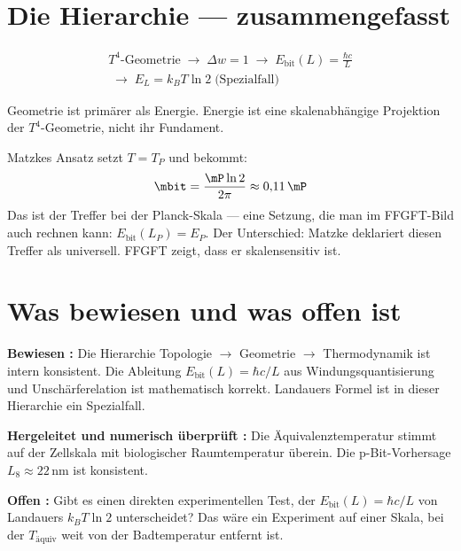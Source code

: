 \section{Die Hierarchie --- zusammengefasst}

\begin{multline*}
  T^4\text{-Geometrie}
  \;\longrightarrow\; \Delta w = 1
  \;\longrightarrow\; E_\text{bit}(L) = \frac{\hbar c}{L} \\
  \;\longrightarrow\; E_L = k_BT\ln 2 \;\text{(Spezialfall)}
\end{multline*}

Geometrie ist primärer als Energie. Energie ist eine skalenabhängige
Projektion der $T^4$-Geometrie, nicht ihr Fundament. 

Matzkes Ansatz setzt $T = T_P$ und bekommt:
\[
  \mbit = \frac{\mP \ln 2}{2\pi} \approx 0{,}11\,\mP
\]
Das ist der Treffer bei der Planck-Skala --- eine Setzung, die man
im FFGFT-Bild auch rechnen kann: $E_\text{bit}(L_P) = E_P$.
Der Unterschied: Matzke deklariert diesen Treffer als universell.
FFGFT zeigt, dass er skalensensitiv ist. 

\section{Was bewiesen und was offen ist}

\textbf{Bewiesen :} Die Hierarchie Topologie $\to$ Geometrie $\to$
Thermodynamik ist intern konsistent. Die Ableitung $E_\text{bit}(L) = \hbar c/L$
aus Windungsquantisierung und Unschärferelation ist mathematisch korrekt.
Landauers Formel ist in dieser Hierarchie ein Spezialfall.

\textbf{Hergeleitet und numerisch überprüft :} Die Äquivalenztemperatur
stimmt auf der Zellskala mit biologischer Raumtemperatur überein.
Die p-Bit-Vorhersage $L_8 \approx 22$\,nm ist konsistent.

\textbf{Offen :} Gibt es einen direkten experimentellen Test, der
$E_\text{bit}(L) = \hbar c/L$ von Landauers $k_BT\ln 2$ unterscheidet?
Das wäre ein Experiment auf einer Skala, bei der $T_\text{äquiv}$ weit
von der Badtemperatur entfernt ist.
